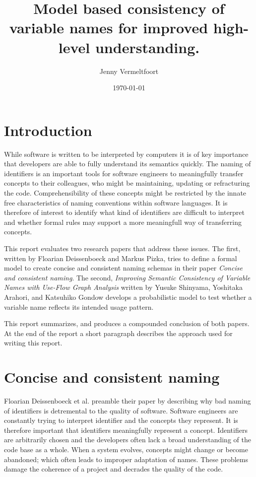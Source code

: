 \documentclass[a4paper,12pt]{article}
\begin{document}
\title{Model based consistency of variable names for improved high-level understanding.}
\author{Jenny Vermeltfoort}
\date{\today}
\maketitle

\section{Introduction}
While software is written to be interpreted by computers it is of key importance that developers are able to fully understand its semantics quickly. The naming of identifiers is an important tools for software engineers to meaningfully transfer concepts to their colleagues, who might be maintaining, updating or refracturing the code. Comprehensibility of these concepts might be restricted by the innate free characteristics of naming conventions within software languages. It is therefore of interest to identify what kind of identifiers are difficult to interpret and whether formal rules may support a more meaningfull way of transferring concepts.

This report evaluates two research papers that address these issues. The first, written by Floarian Deissenboeck and Markus Pizka, tries to define a formal model to create concise and consistent naming schemas in their paper \textit{Concise and consistent naming}. The second, \textit{Improving Semantic Consistency of Variable Names with Use-Flow Graph Analysis} written by Yusuke Shinyama, Yoshitaka Arahori, and Katsuhiko Gondow develops a probabilistic model to test whether a variable name reflects its intended usage pattern. 

This report summarizes, and produces a compounded conclusion of both papers. At the end of the report a short paragraph describes the approach used for writing this report.

\newpage
\section{Concise and consistent naming}
Floarian Deissenboeck et al. preamble their paper by describing why bad naming of identifiers is detremental to the quality of software. Software engineers are constantly trying to interpret identifier and the concepts they represent. It is therefore important that identifiers meaningfully represent a concept. Identifiers are arbitrarily chosen and the developers often lack a broad understanding of the code base as a whole. When a system evolves, concepts might change or become abandoned; which often leads to improper adaptation of names. These problems damage the coherence of a project and decrades the quality of the code.
\end{document}
